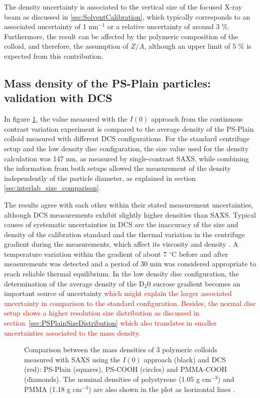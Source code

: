 The density uncertainty is associated to the vertical size of the focused X-ray beam as discussed in \ref{sec:SolventCalibration}, which typically corresponds to an associated uncertainty of 1 nm$^{-1}$ or a relative uncertainty of around 3 $\%$. Furthermore, the result can be affected by the polymeric composition of the colloid, and therefore, the assumption of $Z/A$, although an upper limit of 5 $\%$ is expected from this contribution.

\subsection{Mass density of the PS-Plain particles: validation with DCS}

In figure \ref{fig:DensityComparison}, the value measured with the $I(0)$ approach from the continuous contrast variation experiment is compared to the average density of the PS-Plain colloid measured with different DCS configurations. For the standard centrifuge setup and the low density disc configuration, the size value used for the density calculation was 147 nm, as measured by single-contrast SAXS, while combining the information from both setups allowed the measurement of the density independently of the particle diameter, as explained in section \ref{sec:interlab_size_comparison}.

The results agree with each other within their stated measurement uncertainties, although DCS measurements exhibit slightly higher densities than SAXS. Typical causes of systematic uncertainties in DCS are the inaccuracy of the size and density of the calibration standard and the thermal variation in the centrifuge gradient during the measurements, which affect its viscosity and density \citep{kamiti_simultaneous_2012}. A temperature variation within the gradient of about 7 $^{\circ}$C before and after measurements was detected and a period of 30 min was considered appropriate to reach reliable thermal equilibrium. In the low density disc configuration, the determination of the average density of the D$_2$0 sucrose gradient becomes an important source of uncertainty \textcolor{red}{which might explain the larger associated uncertainty in comparison to the standard configuration. Besides, the normal disc setup shows a higher resolution size distribution as discussed in section~\ref{sec:PSPlainSizeDistribution} which also translates in smaller uncertainties associated to the mass density.}
\begin{figure}
	\begin{center}
		
	\end{center}
	\caption[Mass densities of 3 polymeric colloids measured with SAXS and DCS.]{Comparison between the mass densities of 3 polymeric colloids measured with SAXS using the $I(0)$ approach (black) and DCS (red): PS-Plain (squares), PS-COOH (circles) and PMMA-COOH (diamonds). The nominal densities of polystyrene (1.05 g cm$^{-3}$) and PMMA (1.18 g cm$^{-3}$) are also shown in the plot as horizontal lines \citep{dingenouts_analysis_1999}.}
	\label{fig:DensityComparison}
\end{figure}

